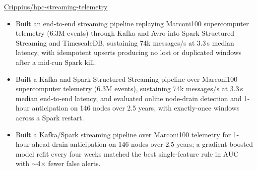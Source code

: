  {}
{
}
{\href{https://github.com/Crippius/hpc-streaming-telemetry}
{Crippius/hpc-streaming-telemetry}}
\begin{itemize}

    \ifde
        \item Built an end-to-end streaming pipeline replaying Marconi100 supercomputer telemetry (6.3M events) through Kafka and Avro into Spark Structured Streaming and TimescaleDB, sustaining 74k messages/s at 3.3\,s median latency, with idempotent upserts producing no lost or duplicated windows after a mid-run Spark kill.
    \else
        \ifhpc
            \item Built a Kafka and Spark Structured Streaming pipeline over Marconi100 supercomputer telemetry (6.3M events), sustaining 74k messages/s at 3.3\,s median end-to-end latency, and evaluated online node-drain detection and 1-hour anticipation on 146 nodes over 2.5 years, with exactly-once windows across a Spark restart.
        \else
            \item Built a Kafka/Spark streaming pipeline over Marconi100 telemetry for 1-hour-ahead drain anticipation on 146 nodes over 2.5 years; a gradient-boosted model refit every four weeks matched the best single-feature rule in AUC with $\sim$4$\times$ fewer false alerts.
        \fi
    \fi

\end{itemize}

\medskip
